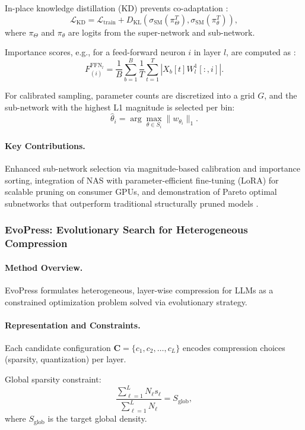 In-place knowledge distillation (KD) prevents co-adaptation \cite{Hinton2015}:
\[
\mathcal{L}_{\text{KD}} = \mathcal{L}_{\text{train}} + D_{\text{KL}}\left( \sigma_{\text{SM}}(\pi_\Theta^T), \sigma_{\text{SM}}(\pi_{\theta}^T) \right),
\]
where \(\pi_\Theta\) and \(\pi_\theta\) are logits from the super-network and sub-network.

Importance scores, e.g., for a feed-forward neuron \(i\) in layer \(l\), are computed as \cite{Michel2019}:
\[
F_{(i)}^{\text{FFN}_l} = \frac{1}{B} \sum_{b=1}^B \frac{1}{T} \sum_{t=1}^T \left| X_b[t] W_l^1[:, i] \right|.
\]

For calibrated sampling, parameter counts are discretized into a grid \(G\), and the sub-network with the highest L1 magnitude is selected per bin:
\[
\hat{\theta}_i = \arg\max_{\theta \in S_i} \| w_{\theta_i} \|_1.
\]

\paragraph{Key Contributions.} 
Enhanced sub-network selection via magnitude-based calibration and importance sorting, integration of NAS with parameter-efficient fine-tuning (LoRA) for scalable pruning on consumer GPUs, and demonstration of Pareto optimal subnetworks that outperform traditional structurally pruned models \cite{Sukthanker2024}.

\subsubsection{EvoPress: Evolutionary Search for Heterogeneous Compression \cite{evopress2024}}

\paragraph{Method Overview.} EvoPress formulates heterogeneous, layer-wise compression for LLMs as a constrained optimization problem solved via evolutionary strategy.

\paragraph{Representation and Constraints.}
Each candidate configuration $\mathbf{C} = \{c_1, c_2, \dots, c_L\}$ encodes compression choices (sparsity, quantization) per layer.

Global sparsity constraint:
\begin{equation}
	\frac{\sum_{\ell=1}^L N_\ell s_\ell}{\sum_{\ell=1}^L N_\ell} = S_{\text{glob}},
\end{equation}
where $S_{\text{glob}}$ is the target global density.

